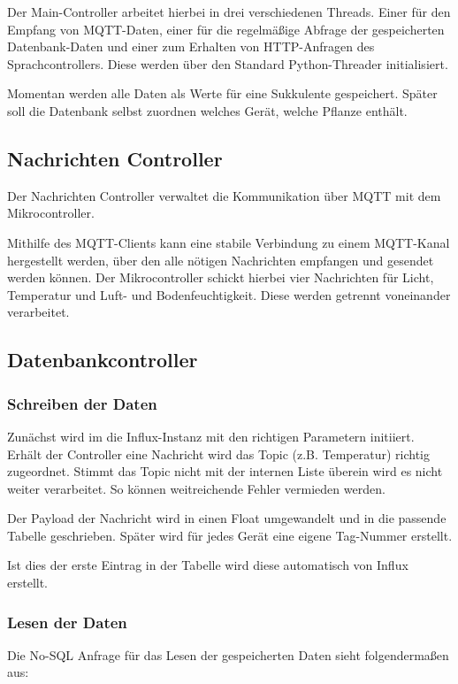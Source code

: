 Der Main-Controller arbeitet hierbei in drei verschiedenen Threads. Einer für den Empfang von MQTT-Daten, einer für die regelmäßige Abfrage der gespeicherten Datenbank-Daten und einer zum Erhalten von HTTP-Anfragen des Sprachcontrollers. Diese werden über den Standard Python-Threader initialisiert.

Momentan werden alle Daten als Werte für eine Sukkulente gespeichert. Später soll die Datenbank selbst zuordnen welches Gerät, welche Pflanze enthält.

\subsection{Nachrichten Controller}
Der Nachrichten Controller verwaltet die Kommunikation über MQTT mit dem Mikrocontroller.

Mithilfe des MQTT-Clients kann eine stabile Verbindung zu einem MQTT-Kanal hergestellt werden, über den alle nötigen Nachrichten empfangen und gesendet werden können. Der Mikrocontroller schickt hierbei vier Nachrichten für Licht, Temperatur und Luft- und Bodenfeuchtigkeit. Diese werden getrennt voneinander verarbeitet.

\subsection{Datenbankcontroller}

\subsubsection{Schreiben der Daten}
Zunächst wird im die Influx-Instanz mit den richtigen Parametern initiiert. 
Erhält der Controller eine Nachricht wird das Topic (z.B. Temperatur) richtig zugeordnet. Stimmt das Topic nicht mit der internen Liste überein wird es nicht weiter verarbeitet. So können weitreichende Fehler vermieden werden.

Der Payload der Nachricht wird in einen Float umgewandelt und in die passende Tabelle geschrieben. Später wird für jedes Gerät eine eigene Tag-Nummer erstellt.

Ist dies der erste Eintrag in der Tabelle wird diese automatisch von Influx erstellt.

\subsubsection{Lesen der Daten}
Die No-SQL Anfrage für das Lesen der gespeicherten Daten sieht folgendermaßen aus:

